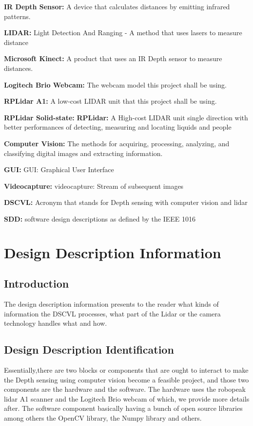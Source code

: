 		\textbf{IR Depth Sensor: }\label{def:depthsensor}
		A device that calculates distances by emitting infrared patterns. 
		
		\textbf{LIDAR: }\label{def:lidar}
		Light Detection And Ranging - A method that uses lasers to measure distance
		
		\textbf{Microsoft Kinect: }\label{def:kinect}
		A product that uses an IR Depth sensor to measure distances.
		
		\textbf{Logitech Brio Webcam: }\label{def:brio}
		The webcam model this project shall be using.
		
		\textbf{RPLidar A1: }\label{def:rplidar}
		A low-cost LIDAR unit that this project shall be using.
		
		\textbf{RPLidar Solid-state: }\textbf{RPLidar: }\label{def:rplidar2}
		A High-cost LIDAR unit single direction with better performances of detecting, measuring and locating liquids and people
		
		\textbf{Computer Vision: }\label{def:vision}
		The methods for acquiring, processing, analyzing, and classifying digital images and extracting information.
		
		\textbf{GUI: }\label{def:gui}
		GUI: Graphical User Interface
		
		\textbf{Videocapture: }\label{def:videocapture}
		videocapture: Stream of subsequent images
		
		\textbf{DSCVL: }\label{def:DSCVL}
		Acronym that stands for Depth sensing with computer vision and lidar
		
		\textbf{SDD: }\label{def:SDD}
		software design descriptions as defined by the IEEE 1016

\section{Design Description Information}
 
	\subsection{Introduction}
	The design description information presents to the reader what kinds of information the DSCVL processes, what part of the Lidar or the camera technology handles what and how.
    
    \subsection{Design Description Identification}
   Essentially,there are two blocks or components that are ought to interact  to make the Depth sensing using computer vision become a feasible project, and those two components are the hardware and the software. The hardware uses the robopeak lidar A1 scanner and the Logitech Brio webcam of which, we provide more details after. The software component basically having a bunch of open source libraries among others the OpenCV library, the Numpy library and others.  
